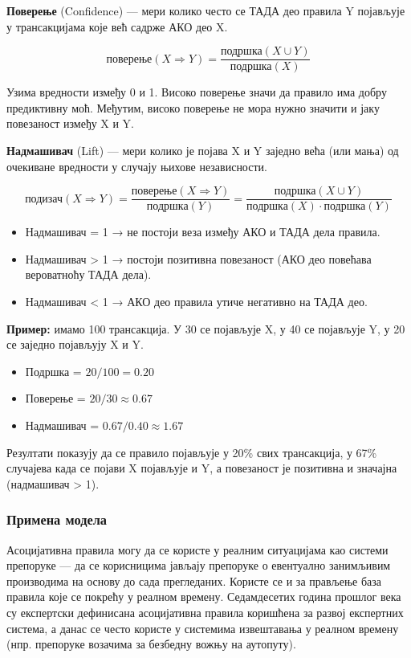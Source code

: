 \textbf{Поверење} (Confidence) — мери колико често се ТАДА део правила Y појављује у трансакцијама које већ садрже АКО део X.

\[
\textrm{поверење}(X \Rightarrow Y)=\frac{\textrm{подршка}(X \cup Y)}{\textrm{подршка}(X)}
\]

Узима вредности између 0 и 1. Високо поверење значи да правило има добру предиктивну моћ. Међутим, високо поверење не мора нужно значити и јаку повезаност између X и Y.

\textbf{Надмашивач} (Lift) — мери колико је појава X и Y заједно већа (или мања) од очекиване вредности у случају њихове независности.

\[
\textrm{подизач}(X \Rightarrow Y)=\frac{\textrm{поверење}(X \Rightarrow Y)}{\textrm{подршка}(Y)}=\frac{\textrm{подршка}(X \cup Y)}{\textrm{подршка}(X) \cdot \textrm{подршка}(Y)}
\]

\begin{itemize}
  \item Надмашивач = 1 → не постоји веза између АКО и ТАДА дела правила.
  \item Надмашивач > 1 → постоји позитивна повезаност (АКО део повећава вероватноћу ТАДА дела).
  \item Надмашивач < 1 → АКО део правила утиче негативно на ТАДА део.
\end{itemize}
\textbf{Пример:} имамо 100 трансакција. У 30 се појављује X, у 40 се појављује Y, у 20 се заједно појављују X и Y.

\begin{itemize}
  \item Подршка = $20 / 100 = 0.20$
  \item Поверење = $20 / 30 \approx 0.67$
  \item Надмашивач = $0.67 / 0.40 \approx 1.67$
\end{itemize}
Резултати показују да се правило појављује у 20\% свих трансакција, у 67\% случајева када се појави X појављује и Y, а повезаност је позитивна и значајна (надмашивач > 1).

\subsubsection{Примена модела}
Асоцијативна правила могу да се користе у реалним ситуацијама као системи препоруке — да се корисницима јављају препоруке о евентуално занимљивим производима на основу до сада прегледаних. Користе се и за прављење база правила које се покрећу у реалном времену. Седамдесетих година прошлог века су експертски дефинисана асоцијативна правила коришћена за развој експертних система, а данас се често користе у системима извештавања у реалном времену (нпр. препоруке возачима за безбедну вожњу на аутопуту).

